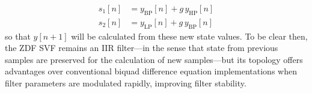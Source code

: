 \begin{align}
  s_1[n] &= y_{\mathrm{BP}}[n] + g\,y_{\mathrm{HP}}[n] \\
  s_2[n] &= y_{\mathrm{LP}}[n] + g\,y_{\mathrm{BP}}[n]
\end{align}
so that $y[n+1]$ will be calculated from these new state values. To be clear then, the ZDF SVF remains 
an IIR filter---in the sense that state from previous samples are preserved for the calculation of 
new samples---but its topology offers advantages over conventional biquad
difference equation implementations when filter 
parameters are modulated rapidly, improving filter stability. 


